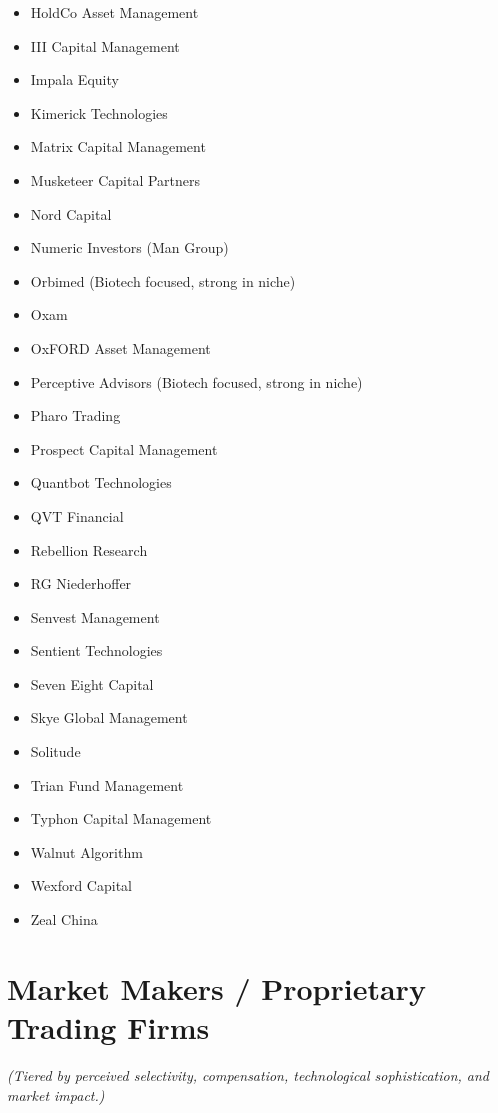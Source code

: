 \documentclass[11pt,a4paper]{article}
\begin{document}
\begin{multicols}{3}
\begin{itemize}[label=\textbullet, leftmargin=*, itemsep=1pt, parsep=0pt]
    \item HoldCo Asset Management
    \item III Capital Management
    \item Impala Equity
    \item Kimerick Technologies
    \item Matrix Capital Management
    \item Musketeer Capital Partners
    \item Nord Capital
    \item Numeric Investors (Man Group)
    \item Orbimed (Biotech focused, strong in niche)
    \item Oxam
    \item OxFORD Asset Management
    \item Perceptive Advisors (Biotech focused, strong in niche)
    \item Pharo Trading
    \item Prospect Capital Management
    \item Quantbot Technologies
    \item QVT Financial
    \item Rebellion Research
    \item RG Niederhoffer
    \item Senvest Management
    \item Sentient Technologies
    \item Seven Eight Capital
    \item Skye Global Management
    \item Solitude
    \item Trian Fund Management
    \item Typhon Capital Management
    \item Walnut Algorithm
    \item Wexford Capital
    \item Zeal China
\end{itemize}
\end{multicols}

\newpage
\section*{Market Makers / Proprietary Trading Firms}
\begin{center}
\footnotesize
\textit{(Tiered by perceived selectivity, compensation, technological sophistication, and market impact.)}
\end{center}
\end{document}
